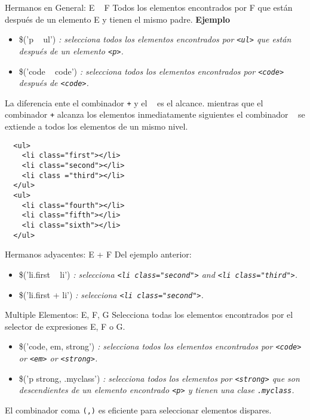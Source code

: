 \begin{frame}[fragile]{Hermanos en General: E ~ F} %
Todos los elementos encontrados por F que están después de un elemento E y
tienen el mismo padre.
\textbf{Ejemplo}
\begin{itemize}
    \item \$('p ~ ul') \textit{: selecciona todos los elementos encontrados por
    \texttt{<ul>} que están después de un elemento \texttt{<p>}.}
    \item \$('code ~ code') \textit{: selecciona todos los elementos encontrados
    por \texttt{<code>} después de \texttt{<code>}.}
\end{itemize}
La diferencia ente el combinador \texttt{+} y el \texttt{~} es el alcance.
mientras que el combinador \texttt{+} alcanza los elementos inmediatamente
siguientes el combinador \texttt{~} se extiende a todos los elementos de un
mismo nivel.
\begin{lstlisting}
  <ul>
    <li class="first"></li>
    <li class="second"></li>
    <li class ="third"></li>
  </ul>
  <ul>
    <li class="fourth"></li>
    <li class="fifth"></li>
    <li class="sixth"></li>
  </ul>
\end{lstlisting}
\end{frame}

\begin{frame}[fragile]{Hermanos adyacentes: E + F} %
Del ejemplo anterior:
\begin{itemize}
    \item \$('li.first ~ li') \textit{: selecciona \texttt{<li class="second"\/>}
    and \texttt{<li class="third"\/>}.}
    \item \$('li.first + li') \textit{: selecciona \texttt{<li class="second"\/>}.}
\end{itemize}
\end{frame}

\begin{frame}[fragile]{Multiple Elementos: E, F, G} %
Selecciona todas los elementos encontrados por el selector de expresiones E, F o G.
\begin{itemize}
    \item \$('code,  em,  strong') \textit{: selecciona todos los elementos
    encontrados por \texttt{<code>} or \texttt{<em>} or \texttt{<strong>}.} 
    \item \$('p strong, .myclass') \textit{: selecciona todos los elementos por
    \texttt{<strong>} que son descendientes de un elemento encontrado
    \texttt{<p>} y tienen una clase \texttt{.myclass}.}
\end{itemize}
El combinador coma \texttt{(,)} es eficiente para seleccionar elementos
dispares.
\end{frame}

